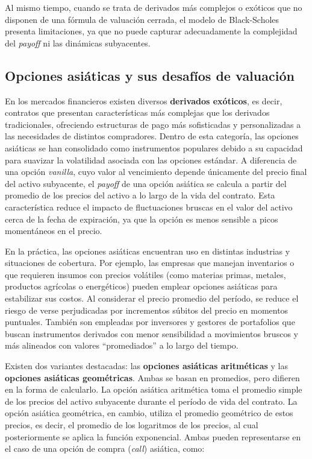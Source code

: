 \documentclass[11pt,a4paper,spanish]{article}
\numberwithin{equation}{section} %
\begin{document}
Al mismo tiempo, cuando se trata de derivados más complejos o exóticos que no disponen de una fórmula de valuación cerrada, el modelo de Black-Scholes presenta limitaciones, ya que no puede capturar adecuadamente la complejidad del \textit{payoff} ni las dinámicas subyacentes. 

\subsection{Opciones asiáticas y sus desafíos de valuación}

En los mercados financieros existen diversos\textbf{ derivados exóticos}, es decir, contratos que presentan características más complejas que los derivados tradicionales, ofreciendo estructuras de pago más sofisticadas y personalizadas a las necesidades de distintos compradores. Dentro de esta categoría, las opciones asiáticas se han consolidado como instrumentos populares debido a su capacidad para suavizar la volatilidad asociada con las opciones estándar. A diferencia de una opción \textit{vanilla}, cuyo valor al vencimiento depende únicamente del precio final del activo subyacente, el \textit{payoff} de una opción asiática se calcula a partir del promedio de los precios del activo a lo largo de la vida del contrato. Esta característica reduce el impacto de fluctuaciones bruscas en el valor del activo cerca de la fecha de expiración, ya que la opción es menos sensible a picos momentáneos en el precio.

En la práctica, las opciones asiáticas encuentran uso en distintas industrias y situaciones de cobertura. Por ejemplo, las empresas que manejan inventarios o que requieren insumos con precios volátiles (como materias primas, metales, productos agrícolas o energéticos) pueden emplear opciones asiáticas para estabilizar sus costos. Al considerar el precio promedio del período, se reduce el riesgo de verse perjudicadas por incrementos súbitos del precio en momentos puntuales. También son empleadas por inversores y gestores de portafolios que buscan instrumentos derivados con menor sensibilidad a movimientos bruscos y más alineados con valores “promediados” a lo largo del tiempo.

Existen dos variantes destacadas: las \textbf{opciones asiáticas aritméticas} y las \textbf{opciones asiáticas geométricas}. Ambas se basan en promedios, pero difieren en la forma de calcularlo. La opción asiática aritmética toma el promedio simple de los precios del activo subyacente durante el período de vida del contrato. La opción asiática geométrica, en cambio, utiliza el promedio geométrico de estos precios, es decir, el promedio de los logaritmos de los precios, al cual posteriormente se aplica la función exponencial. Ambas pueden representarse en el caso de una opción de compra (\textit{call}) asiática, como:
\end{document}
